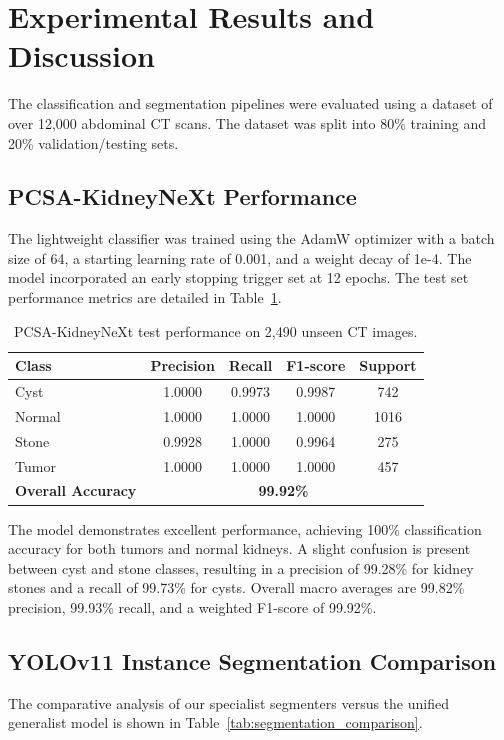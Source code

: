 \documentclass[preprint,12pt]{elsarticle}
\begin{document}
\section{Experimental Results and Discussion}
\label{sec:results}
The classification and segmentation pipelines were evaluated using a dataset of over 12,000 abdominal CT scans. The dataset was split into 80\% training and 20\% validation/testing sets.

\subsection{PCSA-KidneyNeXt Performance}
The lightweight classifier was trained using the AdamW optimizer with a batch size of 64, a starting learning rate of 0.001, and a weight decay of 1e-4. The model incorporated an early stopping trigger set at 12 epochs. The test set performance metrics are detailed in Table~\ref{tab:classification_metrics}.

\begin{table}[h]
\centering
\caption{PCSA-KidneyNeXt test performance on 2,490 unseen CT images.}
\label{tab:classification_metrics}
\begin{tabular}{l c c c c}
\toprule
\textbf{Class} & \textbf{Precision} & \textbf{Recall} & \textbf{F1-score} & \textbf{Support} \\
\midrule
Cyst & 1.0000 & 0.9973 & 0.9987 & 742 \\
Normal & 1.0000 & 1.0000 & 1.0000 & 1016 \\
Stone & 0.9928 & 1.0000 & 0.9964 & 275 \\
Tumor & 1.0000 & 1.0000 & 1.0000 & 457 \\
\midrule
\textbf{Overall Accuracy} & \multicolumn{4}{c}{\textbf{99.92\%}} \\
\bottomrule
\end{tabular}
\end{table}

The model demonstrates excellent performance, achieving 100\% classification accuracy for both tumors and normal kidneys. A slight confusion is present between cyst and stone classes, resulting in a precision of 99.28\% for kidney stones and a recall of 99.73\% for cysts. Overall macro averages are 99.82\% precision, 99.93\% recall, and a weighted F1-score of 99.92\%.

\subsection{YOLOv11 Instance Segmentation Comparison}
The comparative analysis of our specialist segmenters versus the unified generalist model is shown in Table~\ref{tab:segmentation_comparison}.
\end{document}
